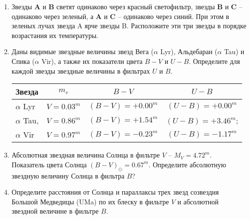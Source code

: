 \documentclass[12pt]{article}
\begin{document}
 \begin{enumerate}[resume]
        \item Звезды \textbf{A} и \textbf{B} светят одинаково через красный светофильтр, звезды \textbf{B} и \textbf{C} -- одинаково через зеленый, а \textbf{A} и \textbf{C} – одинаково через синий. При этом в зеленых лучах звезда A ярче звезды B. Расположите эти три звезды в порядке возрастания их температуры.
        \item Даны видимые звездные величины звезд Вега ($\alpha$ Lyr), Альдебаран ($\alpha$ Tau) и Спика ($\alpha$ Vir), а также их показатели цвета $B-V$ и $U-B$. Определите для каждой звезды звездные величины в фильтрах $U$ и $B$.
    
        \begin{center}
        \begin{tabular}[t]{|l|c|c|c|}
            \hline
            \hline
            Звезда &  $m_v$ & $B-V$ & $U-B$\\
            \hline
            $\alpha$ Lyr & $V=0.03^m$ & $(B-V) = + 0.00^m$ & $(U-B)=+0.00^m$\\
            \hline
            $\alpha$ Tau, & $V=0.86^m$ & $(B-V) = + 1.54^m$ & $(U-B)=+ 3.46^m$; \\
            \hline 
            $\alpha$ Vir & $V= 0.97^m$ & $(B-V)= -0.23^m$ & $(U-B)=- 1.17^m$ \\
            \hline
            \hline 
        \end{tabular}
        \end{center}
        \item Абсолютная звездная величина Солнца в фильтре $V$ -- $M_V=4.72^m$. Показатель цвета Солнца $(B-V)_{\odot}=0.67^m$. Определите абсолютную звездную величину Солнца в фильтра $B$?
        \item Определите расстояния от Солнца и параллаксы трех звезд созвездия Большой Медведицы (UMa) по их блеску в фильтре $V$ и абсолютной звездной величине в фильтре $B$.
        

\end{enumerate}
\end{document}
